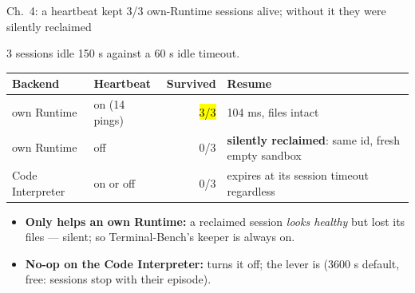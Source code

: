 \begin{frame}{Ch.\ 4: a heartbeat kept 3/3 own-Runtime sessions alive; without it they were silently reclaimed}
{\footnotesize 3 sessions idle 150 s against a 60 s idle timeout.\par}
\vspace{2mm}
\footnotesize
\begin{tabularx}{\textwidth}{@{}l l r Y@{}}
\toprule
\textbf{Backend} & \textbf{Heartbeat} & \textbf{Survived} & \textbf{Resume}\\
\midrule
own Runtime & on (14 pings) & \hl{3/3} & 104 ms, files intact\\
own Runtime & off & 0/3 & \textbf{silently reclaimed}: same id, fresh empty sandbox\\
Code Interpreter & on or off & 0/3 & expires at its session timeout regardless\\
\bottomrule
\end{tabularx}
\par\vspace{3mm}
\begin{itemize}\footnotesize\setlength{\itemsep}{1.2mm}
\item \textbf{Only helps an own Runtime:} a reclaimed session \emph{looks healthy} but lost its files --- silent; so Terminal-Bench's keeper is always on.
\item \textbf{No-op on the Code Interpreter:}  turns it off; the lever is  (3600 s default, free: sessions stop with their episode).
\end{itemize}
\end{frame}

